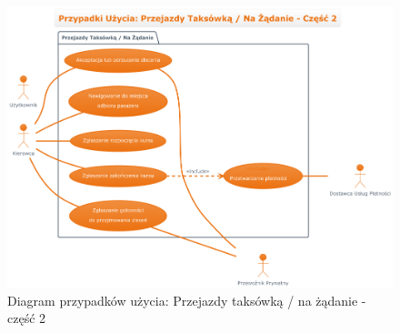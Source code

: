 \documentclass[a4paper,12pt]{article}
\begin{document}
\begin{figure}[H]
    \centering
    \includegraphics[width=0.8\linewidth]{diagramy/przypadki_uzycia/images/diagram_przejazdy_taksowka_2.png}
    \caption{Diagram przypadków użycia: Przejazdy taksówką / na żądanie - część 2}
    \label{fig:diag_pt_2}
\end{figure}
\end{document}
